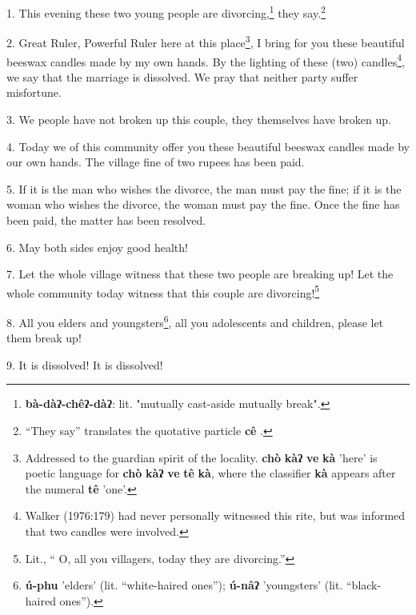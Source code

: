 \setcounter{footnote}{0}

1. This evening these two young people are divorcing,\footnote{\textbf{bà-dàʔ-chêʔ-dàʔ}: lit. "mutually cast-aside mutually break".} they say.\footnote{``They say'' translates the quotative particle \textbf{cê} .}

2. Great Ruler, Powerful Ruler here at this place\footnote{Addressed to the guardian spirit of the locality. \textbf{chò} \textbf{kàʔ} \textbf{ve} \textbf{kà} 'here' is poetic language for \textbf{chò} \textbf{kàʔ} \textbf{ve} \textbf{tê} \textbf{kà}, where the classifier \textbf{kà} appears after the numeral \textbf{tê} 'one'.}, I bring for you these beautiful
beeswax candles made by my own hands. By the lighting of these (two) candles\footnote{Walker (1976:179) had never personally witnessed this rite, but was informed that two candles were involved.},
we say that the marriage is dissolved. We pray that neither party suffer misfortune.

3. We people have not broken up this couple, they themselves have broken up.

4. Today we of this community offer you these beautiful beeswax candles made by
our own hands. The village fine of two rupees has been paid.

5. If it is the man who wishes the divorce, the man must pay the fine; if it is
the woman who wishes the divorce, the woman must pay the fine. Once the fine has
been paid, the matter has been resolved.

6. May both sides enjoy good health!

7. Let the whole village witness that these two people are breaking up! Let the
whole community today witness that this couple are divorcing!\footnote{Lit., `` O, all you villagers, today they are divorcing.''}

8. All you elders and youngsters\footnote{\textbf{ú-phu} 'elders' (lit. ``white-haired ones''); \textbf{ú-nâʔ} 'youngsters' (lit. ``black-haired ones'').}, all you adolescents and children, please
let them break up!

9. It is dissolved! It is dissolved!

